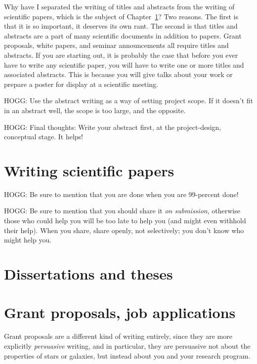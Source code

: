 \documentclass[letterpaper]{book}
\begin{document}
Why have I separated the writing of titles and abstracts from the writing of scientific papers, which is the subject of Chapter~\ref{ch:papers}?
Two reasons.
The first is that it is so important, it deserves its own rant.
The second is that titles and abstracts are a part of many scientific documents in addition to papers.
Grant proposals, white papers, and seminar announcements all require titles and abstracts.
If you are starting out, it is probably the case that before you ever have to write any scientific paper, you will have to write one or more titles and associated abstracts.
This is because you will give talks about your work or prepare a poster for display at a scientific meeting.

HOGG: Use the abstract writing as a way of setting project scope.
If it doesn't fit in an abstract well, the scope is too large, and the opposite.

HOGG: Final thoughts: Write your abstract first, at the project-design, conceptual stage. It helps!

\chapter{Writing scientific papers}\label{ch:papers}

HOGG: Be sure to mention that you are done when you are 99-percent done!

HOGG: Be sure to mention that you should share it \emph{on submission}, otherwise those who could help you will be too late to help you (and might even withhold their help). When you share, share openly, not selectively; you don't know who might help you.

\chapter{Dissertations and theses}

\chapter{Grant proposals, job applications}


Grant proposals are a different kind of writing entirely, since they are more explicitly \emph{persuasive} writing, and in particular, they are persuasive not about the properties of stars or galaxies, but instead about you and your research program.
\end{document}
